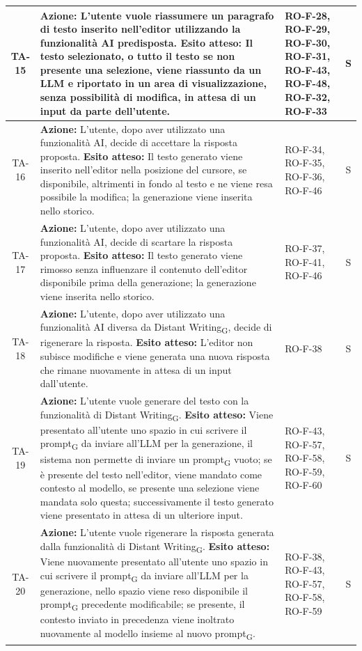 \documentclass[11pt,a4paper]{article}
\newcommand{\gls}[1]{#1\textsubscript{G}}
\begin{document}
\begin{longtable}{|c|p{9cm}|p{3cm}|c|}
\hline
TA-15 & \textbf{Azione:} L'utente vuole riassumere un paragrafo di testo inserito nell'editor utilizzando la funzionalità AI predisposta. \newline \textbf{Esito atteso:} Il testo selezionato, o tutto il testo se non presente una selezione, viene riassunto da un LLM e riportato in un area di visualizzazione, senza possibilità di modifica, in attesa di un input da parte dell'utente. & RO-F-28, RO-F-29, RO-F-30, RO-F-31, RO-F-43, RO-F-48, RO-F-32, RO-F-33  & S \\
\hline
TA-16 & \textbf{Azione:} L'utente, dopo aver utilizzato una funzionalità AI, decide di accettare la risposta proposta. \newline \textbf{Esito atteso:} Il testo generato viene inserito nell'editor nella posizione del cursore, se disponibile, altrimenti in fondo al testo e ne viene resa possibile la modifica; la generazione viene inserita nello storico. & RO-F-34, RO-F-35, RO-F-36, RO-F-46 & S \\
\hline
TA-17 & \textbf{Azione:} L'utente, dopo aver utilizzato una funzionalità AI, decide di scartare la risposta proposta. \newline \textbf{Esito atteso:} Il testo generato viene rimosso senza influenzare il contenuto dell'editor disponibile prima della generazione; la generazione viene inserita nello storico. & RO-F-37, RO-F-41, RO-F-46  & S \\
\hline
TA-18 & \textbf{Azione:} L'utente, dopo aver utilizzato una funzionalità AI diversa da \gls{Distant Writing}, decide di rigenerare la risposta. \newline \textbf{Esito atteso:} L'editor non subisce modifiche e viene generata una nuova risposta che rimane nuovamente in attesa di un input dall'utente. & RO-F-38  & S \\
\hline
TA-19 & \textbf{Azione:} L'utente vuole generare del testo con la funzionalità di \gls{Distant Writing}. \newline \textbf{Esito atteso:} Viene presentato all'utente uno spazio in cui scrivere il \gls{prompt} da inviare all'LLM per la generazione, il sistema non permette di inviare un \gls{prompt} vuoto; se è presente del testo nell'editor, viene mandato come contesto al modello, se presente una selezione viene mandata solo questa; successivamente il testo generato viene presentato in attesa di un ulteriore input. & RO-F-43, RO-F-57, RO-F-58, RO-F-59, RO-F-60  & S \\
\hline
TA-20 & \textbf{Azione:} L'utente vuole rigenerare la risposta generata dalla funzionalità di \gls{Distant Writing}. \newline \textbf{Esito atteso:} Viene nuovamente presentato all'utente uno spazio in cui scrivere il \gls{prompt} da inviare all'LLM per la generazione, nello spazio viene reso disponibile il \gls{prompt} precedente modificabile; se presente, il contesto inviato in precedenza viene inoltrato nuovamente al modello insieme al nuovo \gls{prompt}. & RO-F-38, RO-F-43, RO-F-57, RO-F-58, RO-F-59  & S \\

\end{longtable}
\end{document}
